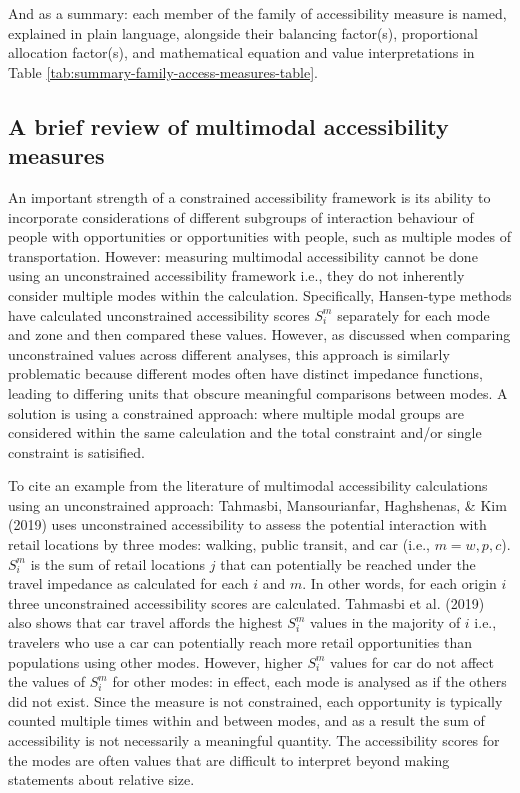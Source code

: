 \documentclass[
11pt, %
oneside, %
english, %
singlespacing, %
]{macthesis} %
\begin{document}
And as a summary: each member of the family of accessibility measure is named, explained in plain language, alongside their balancing factor(s), proportional allocation factor(s), and mathematical equation and value interpretations in Table \ref{tab:summary-family-access-measures-table}.



\subsection{A brief review of multimodal accessibility measures}\label{a-brief-review-of-multimodal-accessibility-measures}

An important strength of a constrained accessibility framework is its ability to incorporate considerations of different subgroups of interaction behaviour of people with opportunities or opportunities with people, such as multiple modes of transportation. However: measuring multimodal accessibility cannot be done using an unconstrained accessibility framework i.e., they do not inherently consider multiple modes within the calculation. Specifically, Hansen-type methods have calculated unconstrained accessibility scores \(S_i^m\) separately for each mode and zone and then compared these values. However, as discussed when comparing unconstrained values across different analyses, this approach is similarly problematic because different modes often have distinct impedance functions, leading to differing units that obscure meaningful comparisons between modes. A solution is using a constrained approach: where multiple modal groups are considered within the same calculation and the total constraint and/or single constraint is satisified.

To cite an example from the literature of multimodal accessibility calculations using an unconstrained approach: Tahmasbi, Mansourianfar, Haghshenas, \& Kim (2019) uses unconstrained accessibility to assess the potential interaction with retail locations by three modes: walking, public transit, and car (i.e., \(m = w, p, c\)). \(S_i^m\) is the sum of retail locations \(j\) that can potentially be reached under the travel impedance as calculated for each \(i\) and \(m\). In other words, for each origin \(i\) three unconstrained accessibility scores are calculated. Tahmasbi et al. (2019) also shows that car travel affords the highest \(S_i^{m}\) values in the majority of \(i\) i.e., travelers who use a car can potentially reach more retail opportunities than populations using other modes. However, higher \(S_i^{m}\) values for car do not affect the values of \(S_i^{m}\) for other modes: in effect, each mode is analysed as if the others did not exist. Since the measure is not constrained, each opportunity is typically counted multiple times within and between modes, and as a result the sum of accessibility is not necessarily a meaningful quantity. The accessibility scores for the modes are often values that are difficult to interpret beyond making statements about relative size.
\end{document}
